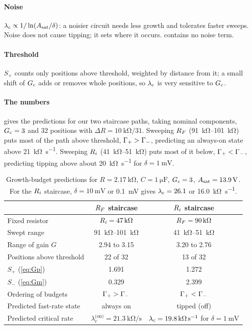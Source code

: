\paragraph{Noise} $\lambda_{c}\propto 1/\ln(A_{\mathrm{sat}}/\delta)$: a noisier circuit needs less growth and tolerates
faster sweeps. Noise does not cause tipping; it sets where it occurs.  contains no noise
term.

\paragraph{Threshold} $S_{+}$ counts only positions above threshold, weighted by distance from it; a
small shift of $G_{c}$ adds or removes whole positions, so $\lambda_{c}$ is very sensitive to $G_{c}$.

\paragraph{The numbers}  gives the predictions for our two staircase paths,
taking nominal components, $G_{c}=3$ and 32 positions with $\Delta R=\SI{10}{\kilo\ohm}/31$. Sweeping $R_{F}$
(\SIrange{91}{101}{\kilo\ohm}) puts most of the path above threshold, $\Gamma_{+}>\Gamma_{-}$, predicting an always-on
state above \SI{21}{\kilo\ohm\per\second}. Sweeping $R_{i}$ (\SIrange{41}{51}{\kilo\ohm}) puts most of it
below, $\Gamma_{+}<\Gamma_{-}$, predicting tipping above about \SI{20}{\kilo\ohm\per\second} for
$\delta=\SI{1}{\milli\volt}$.

\begin{table}[!htb]
  \centering
  \small
  \renewcommand{\arraystretch}{1.15}
  \begin{tabular}{@{}lcc@{}}
    \toprule
    & \textbf{$R_{F}$ staircase} & \textbf{$R_{i}$ staircase} \\
    \midrule
    Fixed resistor & $R_{i}=\SI{47}{\kilo\ohm}$ & $R_{F}=\SI{90}{\kilo\ohm}$ \\
    Swept range & \SIrange{91}{101}{\kilo\ohm} & \SIrange{41}{51}{\kilo\ohm} \\
    Range of gain $G$ & 2.94 to 3.15 & 3.20 to 2.76 \\
    Positions above threshold & 22 of 32 & 13 of 32 \\
    $S_{+}$ (\cref{eq:Gp}) & 1.691 & 1.272 \\
    $S_{-}$ (\cref{eq:Gm}) & 0.329 & 2.399 \\
    Ordering of budgets & $\Gamma_{+}>\Gamma_{-}$ & $\Gamma_{+}<\Gamma_{-}$ \\
    Predicted fast-rate state & always on & tipped (off) \\
    Predicted critical rate & $\lambda_{c}^{\text{(on)}}=\SI{21.3}{\kilo\ohm\per\second}$ &
      $\lambda_{c}=\SI{19.8}{\kilo\ohm\per\second}$ for $\delta=\SI{1}{\milli\volt}$ \\
    \bottomrule
  \end{tabular}
  \caption[Growth-budget predictions for the two staircase paths]{Growth-budget predictions for
  $R=\SI{2.17}{\kilo\ohm}$, $C=\SI{1}{\micro\farad}$, $G_{c}=3$, $A_{\mathrm{sat}}=\SI{13.9}{\volt}$. For the $R_{i}$
  staircase, $\delta=\SI{10}{\milli\volt}$ or \SI{0.1}{\milli\volt} gives $\lambda_{c}=\num{26.1}$ or
  \SI{16.0}{\kilo\ohm\per\second}.}
  \label{tab:budget-theory}
\end{table}

